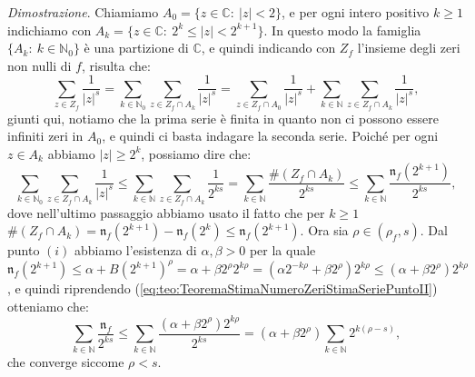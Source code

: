 \documentclass[11pt]{book}
\makeatletter
\theoremstyle{Definizione}
\theoremstyle{TeoremaProposizioneLemmaCorollarioCongettura}
\theoremstyle{OsservazioneNotaEsempio}
\renewenvironment{proof}[1][\proofname]{\par
  \normalfont \topsep6\p@\@plus6\p@\relax
  \trivlist
  \item[\hskip\labelsep
        \itshape
    #1\@addpunct{.}]\ignorespaces
}{%
  \endtrivlist\@endpefalse
}
\renewenvironment{proof}{\textsl{Dimostrazione}.}{}
\newcommand{\N}{\mathbb{N}}
\newcommand{\C}{\mathbb{C}}
\newcommand{\nzeri}[1][]{\mathfrak{n}_{#1}}
\makeatother
\begin{document}
\begin{boxteo}{}
\begin{proof}
Chiamiamo $A_0 = \{z\in \C:\ |z| < 2\}$, e per ogni intero positivo $k\geq 1$ indichiamo con $A_k = \{z\in \C:\ 2^{k}\leq |z| < 2^{k+1}\}$. In questo modo la famiglia $\{A_k:\ k\in \N_0\}$ è una partizione di $\C$, e quindi indicando con $Z_f$ l'insieme degli zeri non nulli di $f$, risulta che:
$$
\sum_{z\in Z_f} \frac{1}{|z|^s} = \sum_{k\in \N_0} \sum_{z\in Z_f \cap A_k} \frac{1}{|z|^s} = \sum_{z\in Z_f \cap A_0} \frac{1}{|z|^s} + \sum_{k\in \N} \sum_{z\in Z_f\cap A_k} \frac{1}{|z|^s},
$$
giunti qui, notiamo che la prima serie è finita in quanto non ci possono essere infiniti zeri in $A_0$, e quindi ci basta indagare la seconda serie. Poiché per ogni $z\in A_k$ abbiamo $|z| \geq 2^k$, possiamo dire che:
\begin{equation}\label{eq:teo:TeoremaStimaNumeroZeriStimaSeriePuntoII}
\sum_{k\in \N_0} \sum_{z\in Z_f\cap A_k} \frac{1}{|z|^s} \leq \sum_{k \in \N} \sum_{z\in Z_f \cap A_k} \frac{1}{2^{ks}} = \sum_{k\in \N} \frac{\#(Z_f\cap A_k)}{2^{ks}} \leq \sum_{k\in \N} \frac{\nzeri[f](2^{k+1})}{2^{ks}},
\end{equation}
dove nell'ultimo passaggio abbiamo usato il fatto che per $k \geq 1$ $\#(Z_f\cap A_k) = \nzeri[f](2^{k+1})-\nzeri[f](2^{k}) \leq \nzeri[f](2^{k+1})$.
Ora sia $\rho\in (\rho_f,s)$. Dal punto $(i)$ abbiamo l'esistenza di $\alpha,\beta > 0$ per la quale $\nzeri[f](2^{k+1}) \leq \alpha + B (2^{k+1})^\rho = \alpha + \beta 2^\rho 2^{k\rho} = (\alpha 2^{-k\rho} +\beta 2^\rho)2^{k\rho}\leq (\alpha+\beta 2^\rho)2^{k\rho}$, e quindi riprendendo (\ref{eq:teo:TeoremaStimaNumeroZeriStimaSeriePuntoII}) otteniamo che:
$$
\sum_{k\in \N} \frac{\nzeri[f]}{2^{ks}}\leq \sum_{k\in \N} \frac{(\alpha+\beta2^\rho)2^{k\rho}}{2^{ks}} = (\alpha+\beta2^\rho) \sum_{k\in \N} 2^{k(\rho-s)},
$$
che converge siccome $\rho<s$.

\end{proof}
\end{boxteo}
\end{document}
